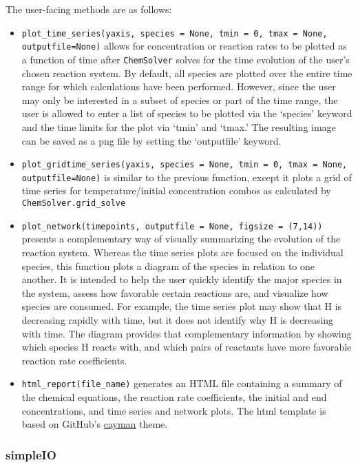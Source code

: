 \documentclass[12pt]{article}
\begin{document}
The user-facing methods are as follows: 
\begin{itemize}
\item \texttt{plot\_time\_series(yaxis, species = None, tmin = 0, tmax = None, outputfile=None)} allows for concentration or reaction rates to be plotted as a function of time after \texttt{ChemSolver} solves for the time evolution of the user's chosen reaction system. By default, all species are plotted over the entire time range for which calculations have been performed. However, since the user may only be interested in a subset of species or part of the time range, the user is allowed to enter a list of species to be plotted via the `species' keyword and the time limits for the plot via `tmin' and `tmax.' The resulting image can be saved as a png file by setting the `outputfile' keyword. 
\item \texttt{plot\_gridtime\_series(yaxis, species = None, tmin = 0, tmax = None, outputfile=None)} is similar to the previous function, except it plots a grid of time series for temperature/initial concentration combos as calculated by \texttt{ChemSolver.grid\_solve}
\item \texttt{plot\_network(timepoints, outputfile = None, figsize = (7,14))} presents a complementary way of visually summarizing the evolution of the reaction system. Whereas the time series plots are focused on the individual species, this function plots a diagram of the species in relation to one another. It is intended to help the user quickly identify the major species in the system, assess how favorable certain reactions are, and visualize how species are consumed. For example, the time series plot may show that H is decreasing rapidly with time, but it does not identify why H is decreasing with time. The diagram provides that complementary information by showing which species H reacts with, and which pairs of reactants have more favorable reaction rate coefficients. 
\item \texttt{html\_report(file\_name)} generates an HTML file containing a summary of the chemical equations, the reaction rate coefficients, the initial and end concentrations, and time series and network plots. The html template is based on GitHub's \href{https://github.com/pages-themes/cayman}{cayman} theme.
\end{itemize}

\subsubsection{simpleIO}
\end{document}
